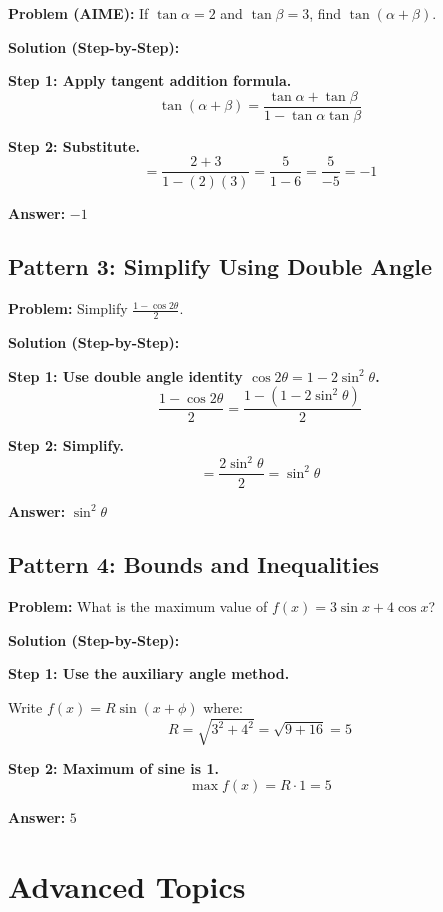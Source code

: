 \documentclass[12pt]{extarticle}
\begin{document}
\begin{examplebox}
\textbf{Problem (AIME):} If $\tan\alpha = 2$ and $\tan\beta = 3$, find $\tan(\alpha + \beta)$.

\textbf{Solution (Step-by-Step):}

\textbf{Step 1: Apply tangent addition formula.}
\[
\tan(\alpha + \beta) = \frac{\tan\alpha + \tan\beta}{1 - \tan\alpha\tan\beta}
\]

\textbf{Step 2: Substitute.}
\[
= \frac{2 + 3}{1 - (2)(3)} = \frac{5}{1 - 6} = \frac{5}{-5} = -1
\]

\textbf{Answer:} $\boxed{-1}$
\end{examplebox}

\subsection{Pattern 3: Simplify Using Double Angle}

\begin{examplebox}
\textbf{Problem:} Simplify $\frac{1 - \cos 2\theta}{2}$.

\textbf{Solution (Step-by-Step):}

\textbf{Step 1: Use double angle identity $\cos 2\theta = 1 - 2\sin^2\theta$.}
\[
\frac{1 - \cos 2\theta}{2} = \frac{1 - (1 - 2\sin^2\theta)}{2}
\]

\textbf{Step 2: Simplify.}
\[
= \frac{2\sin^2\theta}{2} = \sin^2\theta
\]

\textbf{Answer:} $\boxed{\sin^2\theta}$
\end{examplebox}

\subsection{Pattern 4: Bounds and Inequalities}

\begin{examplebox}
\textbf{Problem:} What is the maximum value of $f(x) = 3\sin x + 4\cos x$?

\textbf{Solution (Step-by-Step):}

\textbf{Step 1: Use the auxiliary angle method.}

Write $f(x) = R\sin(x + \phi)$ where:
\[
R = \sqrt{3^2 + 4^2} = \sqrt{9 + 16} = 5
\]

\textbf{Step 2: Maximum of sine is 1.}
\[
\max f(x) = R \cdot 1 = 5
\]

\textbf{Answer:} $\boxed{5}$
\end{examplebox}

\section{Advanced Topics}
\end{document}
